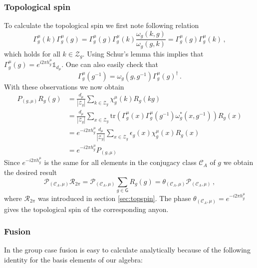 \documentclass[12 pt]{article}
\begin{document}
\subsubsection{Topological spin}

To calculate the topological spin we first note following relation
\begin{equation}
\Gamma^\mu_g(k)\Gamma^\mu_g(g) = \Gamma^\mu_g(g)\Gamma^\mu_g(k)\frac{\omega_g(k,g)}{\omega_g(g,k)} =  \Gamma^\mu_g(g)\Gamma^\mu_g(k)\, ,
\end{equation}
which holds for all $k \in \mathcal{Z}_g$. Using Schur's lemma this implies that $\Gamma_g^\mu(g) = e^{i2\pi h^\mu_g}\mathds{1}_{d_\mu}$. One can also easily check that
\begin{equation}
\Gamma_g^\mu(g^{-1}) = \omega_g(g,g^{-1})\Gamma_g^\mu(g)^\dagger\, .
\end{equation}
With these observations we now obtain
\begin{align}
P_{(g,\mu)}R_g(g) &=  \frac{d_\mu}{|\mathcal{Z}_g|}\sum_{k\in\mathcal{Z}_g} \chi^\mu_g(k)R_g(kg)\nonumber \\
&= \frac{d_\mu}{|\mathcal{Z}_g|}\sum_{x\in\mathcal{Z}_g} \text{tr}(\Gamma^\mu_g(x)\Gamma^\mu_g(g^{-1})\omega^*_g(x,g^{-1}))R_g(x)\nonumber \\
&= e^{-i2\pi h^\mu_g}\frac{d_\mu}{|\mathcal{Z}_g|}\sum_{x\in\mathcal{Z}_g} \epsilon_g(x) \chi^\mu_g(x)R_g(x) \nonumber\\
&=  e^{-i2\pi h^\mu_g} P_{(g,\mu)} \nonumber
\end{align}
Since $e^{-i2\pi h^\mu_g}$ is the same for all elements in the conjugacy class $\mathcal{C}_A$ of $g$ we obtain the desired result
\begin{equation}
\mathcal{P}_{(\mathcal{C}_A,\mu)}\mathcal{R}_{2\pi} = \mathcal{P}_{(\mathcal{C}_A,\mu)}\sum_{g \in  \mathsf{G}}R_g(g) = \theta_{(\mathcal{C}_A,\mu)}\mathcal{P}_{(\mathcal{C}_A,\mu)}\, ,
\end{equation}
where $\mathcal{R}_{2\pi}$ was introduced in section \ref{sec:topspin}. The phase $\theta_{(\mathcal{C}_A,\mu)} = e^{-i2\pi h^\mu_g}$ gives the topological spin of the corresponding anyon.


\subsubsection{Fusion}

In the group case fusion is easy to calculate analytically because of the following identity for the basis elements of our algebra:
\end{document}
